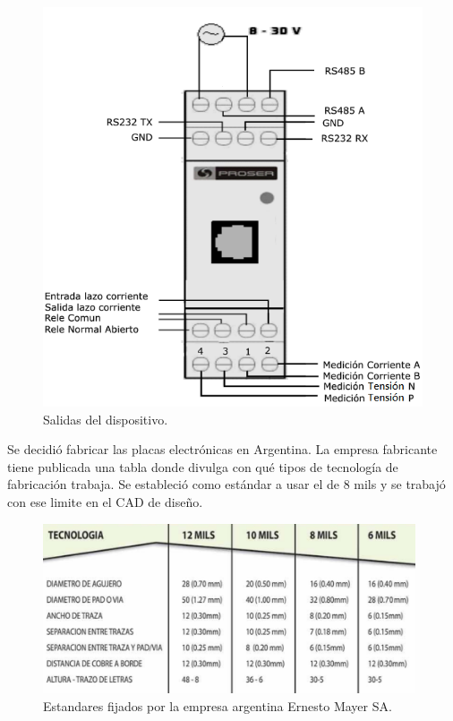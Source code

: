 \begin{figure}[!htb]
	\centering
	\includegraphics[width=120mm,keepaspectratio]{Figures/conectores2.png}
	\caption{Salidas del dispositivo.}
	\label{fig:salidas01}
\end{figure}

Se decidió fabricar las placas electrónicas en Argentina. La empresa fabricante tiene publicada una tabla donde divulga con qué tipos de tecnología de fabricación trabaja. Se estableció como estándar a usar el de 8 mils y se trabajó con ese limite en el CAD de diseño.

\begin{figure}[!htb]
	\centering
	\includegraphics[width=110mm,keepaspectratio]{Figures/estandaresmayer.png}
	\caption{Estandares fijados por la empresa argentina Ernesto Mayer SA\protect\footnotemark .}
	\label{fig:mayerstandar}
\end{figure}



